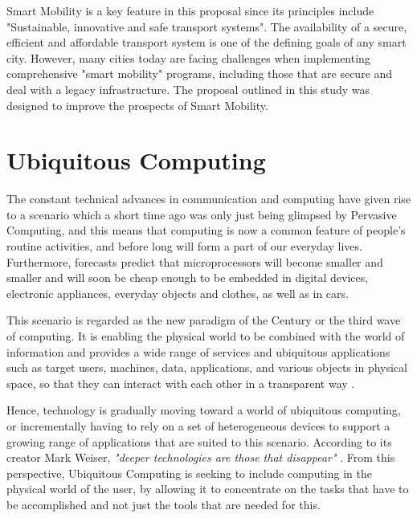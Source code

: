 Smart Mobility is a key feature in this proposal since its principles include "Sustainable, innovative and safe transport systems".
The availability of a secure, efficient and affordable transport system is one of the defining goals of any smart city. However, many cities today are facing challenges when implementing comprehensive "smart mobility" programs, including those that are secure and deal with a legacy infrastructure. The proposal outlined in this study was designed to improve the prospects of Smart Mobility.

\section{Ubiquitous Computing}

The constant technical advances in communication and computing have given rise to a scenario which a short time ago was only just being glimpsed by Pervasive Computing, and this means that computing is now a common feature of people's routine activities, and before long will form a part of our everyday lives. Furthermore, forecasts predict that microprocessors will become smaller and smaller and will soon be cheap enough to be embedded in digital devices, electronic appliances, everyday objects and clothes, as well as in cars.

This scenario is regarded as the new paradigm of the Century\cite{943998} \cite{Saha2003}  or the third wave of computing. It is enabling the physical world to be combined with the world of information and provides a wide range of services and ubiquitous applications such as target users, machines, data, applications, and various objects in physical space, so that they can interact with each other in a transparent way \cite{Ranganathan2005}. 

Hence, technology is gradually moving toward a world of ubiquitous computing, or incrementally having to rely on a set of heterogeneous devices to support a growing range of applications that are suited to this scenario.
According to its creator Mark Weiser, \textit{"deeper technologies are those that disappear"} \cite{Weiser1999}. From this perspective, Ubiquitous Computing is seeking to include computing in the physical world of the user, by allowing it to concentrate on the tasks that have to be accomplished and not just the tools that are needed for this.

